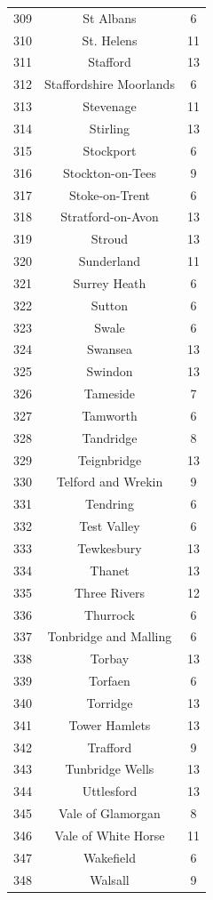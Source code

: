 \documentclass[Royal,times,sageh]{sagej}
\begin{document}
\begin{table}[!htbp]
\begin{tabular}{@{\extracolsep{5pt}} ccc}
309 & St Albans & 6 \\ 
310 & St. Helens & 11 \\ 
311 & Stafford & 13 \\ 
312 & Staffordshire Moorlands & 6 \\ 
313 & Stevenage & 11 \\ 
314 & Stirling & 13 \\ 
315 & Stockport & 6 \\ 
316 & Stockton-on-Tees & 9 \\ 
317 & Stoke-on-Trent & 6 \\ 
318 & Stratford-on-Avon & 13 \\ 
319 & Stroud & 13 \\ 
320 & Sunderland & 11 \\ 
321 & Surrey Heath & 6 \\ 
322 & Sutton & 6 \\ 
323 & Swale & 6 \\ 
324 & Swansea & 13 \\ 
325 & Swindon & 13 \\ 
326 & Tameside & 7 \\ 
327 & Tamworth & 6 \\ 
328 & Tandridge & 8 \\ 
329 & Teignbridge & 13 \\ 
330 & Telford and Wrekin & 9 \\ 
331 & Tendring & 6 \\ 
332 & Test Valley & 6 \\ 
333 & Tewkesbury & 13 \\ 
334 & Thanet & 13 \\ 
335 & Three Rivers & 12 \\ 
336 & Thurrock & 6 \\ 
337 & Tonbridge and Malling & 6 \\ 
338 & Torbay & 13 \\ 
339 & Torfaen & 6 \\ 
340 & Torridge & 13 \\ 
341 & Tower Hamlets & 13 \\ 
342 & Trafford & 9 \\ 
343 & Tunbridge Wells & 13 \\ 
344 & Uttlesford & 13 \\ 
345 & Vale of Glamorgan & 8 \\ 
346 & Vale of White Horse & 11 \\ 
347 & Wakefield & 6 \\ 
348 & Walsall & 9 \\ 

\end{tabular}
\end{table}
\end{document}
